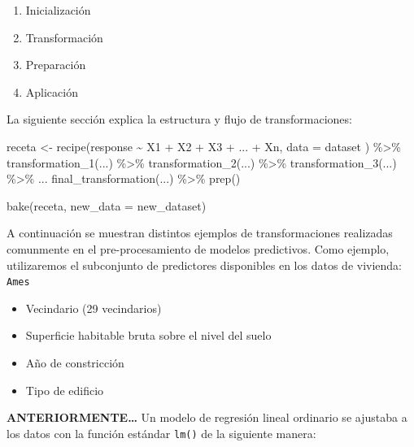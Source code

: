 \documentclass[
]{book}
\newenvironment{Shaded}{\begin{snugshade}}{\end{snugshade}}
\newcommand{\AttributeTok}[1]{\textcolor[rgb]{0.77,0.63,0.00}{#1}}
\newcommand{\FunctionTok}[1]{\textcolor[rgb]{0.00,0.00,0.00}{#1}}
\newcommand{\NormalTok}[1]{#1}
\newcommand{\OtherTok}[1]{\textcolor[rgb]{0.56,0.35,0.01}{#1}}
\newcommand{\SpecialCharTok}[1]{\textcolor[rgb]{0.00,0.00,0.00}{#1}}
\begin{document}
\begin{enumerate}
\def\labelenumi{\arabic{enumi}.}
\item
  Inicialización
\item
  Transformación
\item
  Preparación
\item
  Aplicación
\end{enumerate}

La siguiente sección explica la estructura y flujo de transformaciones:

\begin{Shaded}
\begin{Highlighting}[]
\NormalTok{receta }\OtherTok{\textless{}{-}} \FunctionTok{recipe}\NormalTok{(response }\SpecialCharTok{\textasciitilde{}}\NormalTok{ X1 }\SpecialCharTok{+}\NormalTok{ X2 }\SpecialCharTok{+}\NormalTok{ X3 }\SpecialCharTok{+}\NormalTok{ ... }\SpecialCharTok{+}\NormalTok{ Xn, }\AttributeTok{data =}\NormalTok{ dataset ) }\SpecialCharTok{\%\textgreater{}\%} 
  \FunctionTok{transformation\_1}\NormalTok{(...) }\SpecialCharTok{\%\textgreater{}\%} 
  \FunctionTok{transformation\_2}\NormalTok{(...) }\SpecialCharTok{\%\textgreater{}\%} 
  \FunctionTok{transformation\_3}\NormalTok{(...) }\SpecialCharTok{\%\textgreater{}\%} 
\NormalTok{  ...}
  \FunctionTok{final\_transformation}\NormalTok{(...) }\SpecialCharTok{\%\textgreater{}\%} 
  \FunctionTok{prep}\NormalTok{()}

\FunctionTok{bake}\NormalTok{(receta, }\AttributeTok{new\_data =}\NormalTok{ new\_dataset)}
\end{Highlighting}
\end{Shaded}

A continuación se muestran distintos ejemplos de transformaciones realizadas comunmente en el pre-procesamiento de modelos predictivos. Como ejemplo, utilizaremos el subconjunto de predictores disponibles en los datos de vivienda: \texttt{Ames}

\begin{itemize}
\item
  Vecindario (29 vecindarios)
\item
  Superficie habitable bruta sobre el nivel del suelo
\item
  Año de constricción
\item
  Tipo de edificio
\end{itemize}

\textbf{ANTERIORMENTE\ldots{}} Un modelo de regresión lineal ordinario se ajustaba a los datos con la función estándar \texttt{lm()} de la siguiente manera:
\end{document}

